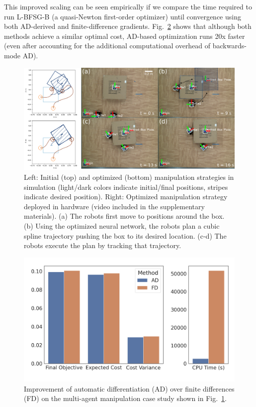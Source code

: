 This improved scaling can be seen empirically if we compare the time required to run L-BFSG-B (a quasi-Newton first-order optimizer) until convergence using both AD-derived and finite-difference gradients. Fig.~\ref{ch5:fig:ablation} shows that although both methods achieve a similar optimal cost, AD-based optimization runs 20x faster (even after accounting for the additional computational overhead of backwards-mode AD).

\begin{figure}[tb]
    \centering
    \includegraphics[width=\linewidth]{images/ch5/mam_composite_w_sim.png}
    \caption{Left: Initial (top) and optimized (bottom) manipulation strategies in simulation (light/dark colors indicate initial/final positions, stripes indicate desired position). Right: Optimized manipulation strategy deployed in hardware (video included in the supplementary materials). (a) The robots first move to positions around the box. (b) Using the optimized neural network, the robots plan a cubic spline trajectory pushing the box to its desired location. (c-d) The robots execute the plan by tracking that trajectory.}
    \label{ch5:fig:mam_hw}
\end{figure}

\begin{figure}[t]
    \centering
    \includegraphics[width=0.7\linewidth]{images/ch5/mam_ablation_ad_fd.png}
    \caption{Improvement of automatic differentiation (AD) over finite differences (FD) on the multi-agent manipulation case study shown in Fig.~\ref{ch5:fig:mam_hw}.}
    \label{ch5:fig:ablation}
\end{figure}

